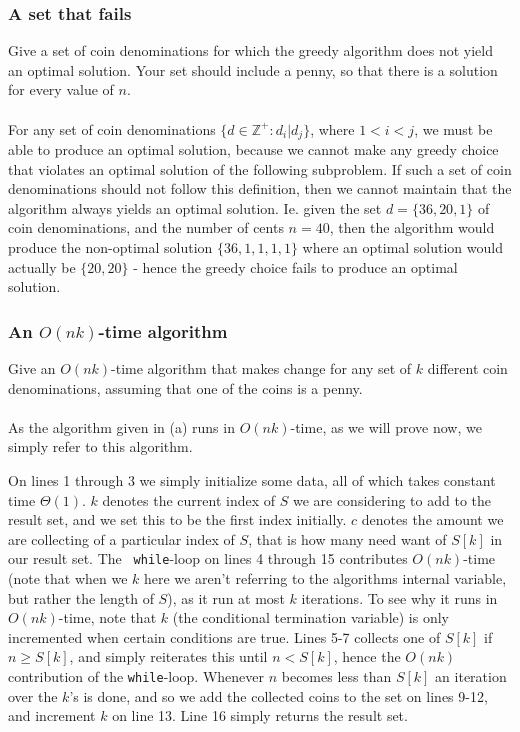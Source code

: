 \documentclass[11pt,english]{article}
\begin{document}
\newpage
\subsubsection*{A set that fails}
\large{Give a set of coin denominations for which the greedy algorithm
does not yield an optimal solution. Your set should include a penny, so
that there is a solution for every value of $n$.}
\\\\
For any set of coin denominations
$\{d \in \mathbb{Z}^{+} : d_i | d_{j}\}$, where $1 < i < j$, we must be able to
produce an optimal solution, because we cannot make any greedy choice that
violates an optimal solution of the following subproblem. If such a set of
coin denominations should not follow this definition, then we cannot maintain
that the algorithm always yields an optimal solution. Ie. given the set
$d = \{36, 20, 1\}$ of coin denominations, and the number of cents $n = 40$,
then the algorithm would produce the non-optimal solution $\{36, 1, 1, 1, 1\}$
where an optimal solution would actually be $\{20, 20\}$ - hence the greedy
choice fails to produce an optimal solution.

\subsubsection*{An $O(nk)$-time algorithm}
\large{Give an $O(nk)$-time algorithm that makes change for any set of $k$
different coin denominations, assuming that one of the coins is a penny.}
\\\\
As the algorithm given in (a) runs in $O(nk)$-time, as we will prove now, we
simply refer to this algorithm.

On lines 1 through 3 we simply initialize some data, all of which takes
constant time $\Theta(1)$. $k$ denotes the current index of $S$ we are
considering to add to the result set, and we set this to be the first index
initially. $c$ denotes the amount we are collecting of a particular index of
$S$, that is how many need want of $S[k]$ in our result set. The \texttt{
while}-loop on lines 4 through 15 contributes $O(nk)$-time (note that when we
$k$ here we aren't referring to the algorithms internal variable, but rather
the length of $S$), as it run at most $k$ iterations. To see why it runs in
$O(nk)$-time, note that $k$ (the conditional termination variable) is only
incremented when certain conditions are true. Lines 5-7 collects one of $S[k]$
if $n \geq S[k]$, and simply reiterates this until $n < S[k]$, hence the
$O(nk)$ contribution of the \texttt{while}-loop. Whenever $n$ becomes less
than $S[k]$ an iteration over the $k$'s is done, and so we add the collected
coins to the set on lines 9-12, and increment $k$ on line 13. Line 16 simply
returns the result set.








\end{document}
